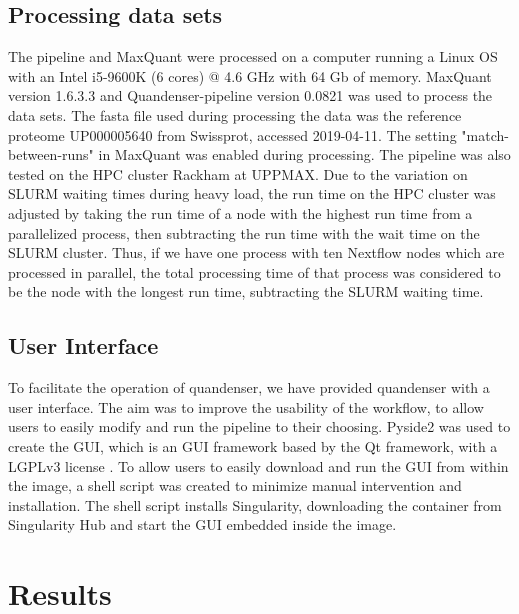 \documentclass[11pt]{article}
\begin{document}
\subsection*{Processing data sets}
The pipeline and MaxQuant were processed on a computer running a Linux OS with an Intel i5-9600K (6 cores) @ 4.6 GHz with 64 Gb of memory. MaxQuant version 1.6.3.3 and Quandenser-pipeline version 0.0821 was used to process the data sets. The fasta file used during processing the data was the reference proteome UP000005640 from Swissprot, accessed 2019-04-11. The setting "match-between-runs" in MaxQuant was enabled during processing. The pipeline was also tested on the HPC cluster Rackham at UPPMAX. Due to the variation on SLURM waiting times during heavy load, the run time on the HPC cluster was adjusted by taking the run time of a node with the highest run time from a parallelized process, then subtracting the run time with the wait time on the SLURM cluster. Thus, if we have one process with ten Nextflow nodes which are processed in parallel, the total processing time of that process was considered to be the node with the longest run time, subtracting the SLURM waiting time.


\subsection*{User Interface}
To facilitate the operation of quandenser, we have provided quandenser with a user interface. The aim was to improve the usability of the workflow, to allow users to easily modify and run the pipeline to their choosing. Pyside2 was used to create the GUI, which is an GUI framework based by the Qt framework, with a LGPLv3 license \cite{pyside2}. To allow users to easily download and run the GUI from within the image, a shell script was created to minimize manual intervention and installation. The shell script installs Singularity, downloading the container from Singularity Hub and start the GUI embedded inside the image.

\section*{Results}
\end{document}
